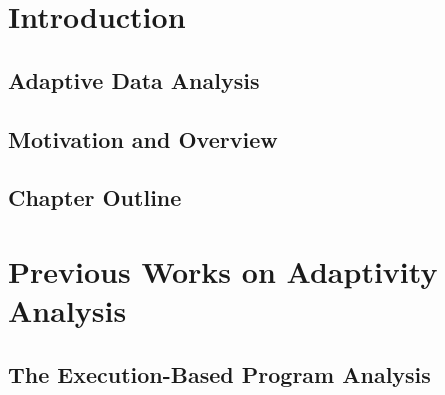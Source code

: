 \documentclass[12pt, letterpaper]{report}   %
\begin{document}

\chapter*{}

\chapter{Introduction}

\section{Adaptive Data Analysis}
\label{sec:adapt-background}


\section{Motivation and Overview}
\label{sec:adapt-motivation}


\section{Chapter Outline}
\label{sec:adapt-outline}


\chapter{Previous Works on Adaptivity Analysis}
\label{sec:prework}
\section{The Execution-Based Program Analysis}
\label{sec:prework-exe}
% 

\end{document}
